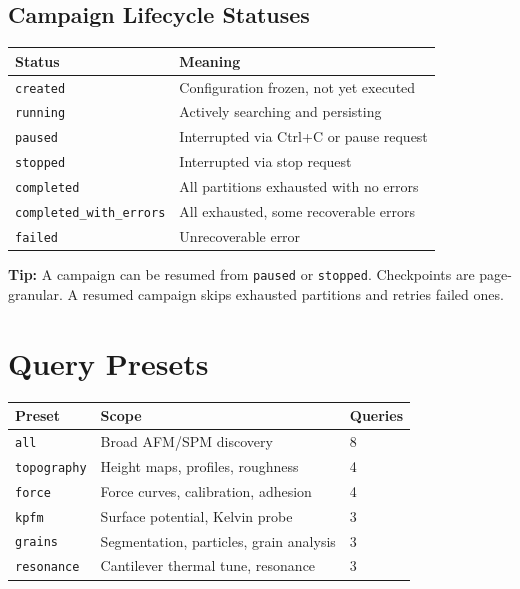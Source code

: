 \documentclass[11pt,a4paper]{article}
\begin{document}
\subsection{Campaign Lifecycle Statuses}

\begin{center}
\begin{tabular}{ll}
\toprule
\textbf{Status} & \textbf{Meaning} \\
\midrule
\texttt{created} & Configuration frozen, not yet executed \\
\texttt{running} & Actively searching and persisting \\
\texttt{paused} & Interrupted via Ctrl+C or pause request \\
\texttt{stopped} & Interrupted via stop request \\
\texttt{completed} & All partitions exhausted with no errors \\
\texttt{completed\_with\_errors} & All exhausted, some recoverable errors \\
\texttt{failed} & Unrecoverable error \\
\bottomrule
\end{tabular}
\end{center}

\begin{tipbox}
\textbf{Tip:} A campaign can be resumed from \texttt{paused} or \texttt{stopped}. Checkpoints are page-granular. A resumed campaign skips exhausted partitions and retries failed ones.
\end{tipbox}

\section{Query Presets}

\begin{center}
\begin{tabular}{lll}
\toprule
\textbf{Preset} & \textbf{Scope} & \textbf{Queries} \\
\midrule
\texttt{all} & Broad AFM/SPM discovery & 8 \\
\texttt{topography} & Height maps, profiles, roughness & 4 \\
\texttt{force} & Force curves, calibration, adhesion & 4 \\
\texttt{kpfm} & Surface potential, Kelvin probe & 3 \\
\texttt{grains} & Segmentation, particles, grain analysis & 3 \\
\texttt{resonance} & Cantilever thermal tune, resonance & 3 \\
\bottomrule
\end{tabular}
\end{center}
\end{document}
